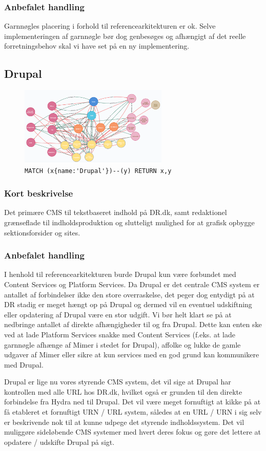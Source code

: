 \documentclass{article}
\begin{document}
\subsubsection*{Anbefalet handling}
Garnnøgles placering i forhold til referencearkitekturen er ok. Selve implementeringen af garnnøgle bør dog genbesøges og afhængigt af det reelle forretningsbehov skal vi have set på en ny implementering.


\subsection{Drupal}
\begin{figure}[H]
\includegraphics[width=200pt]{Drupal.PNG}
\cprotect\caption{\verb|MATCH (x{name:'Drupal'})--(y) RETURN x,y|}
\end{figure}
\subsubsection*{Kort beskrivelse}
Det primære CMS til tekstbaseret indhold på DR.dk, samt redaktionel grænseflade til indholdsproduktion og slutteligt mulighed for at grafisk opbygge sektionsforsider og sites.
\subsubsection*{Anbefalet handling}
I henhold til referencearkitekturen burde Drupal kun være forbundet med Content Services og Platform Services. Da Drupal er det centrale CMS system er antallet af forbindelser ikke den store overraskelse, det peger dog entydigt på at DR stadig er meget hængt op på Drupal og dermed vil en eventuel udskiftning eller opdatering af Drupal være en stor udgift.
Vi bør helt klart se på at nedbringe antallet af direkte afhængigheder til og fra Drupal. 
Dette kan enten ske ved at lade Platform Services snakke med Content Services (f.eks. at lade garnnøgle afhænge af Mimer i stedet for Drupal), affolke og lukke de gamle udgaver af Mimer eller sikre at kun services med en god grund kan kommunikere med Drupal.

Drupal er lige nu vores styrende CMS system, det vil sige at Drupal har kontrollen med alle URL hos DR.dk, hvilket også er grunden til den direkte forbindelse fra Hydra ned til Drupal. Det vil være meget fornuftigt at kikke på at få etableret et fornuftigt URN / URL system, således at en URL / URN i sig selv er beskrivende nok til at kunne udpege det styrende indholdssystem. Det vil muliggøre sideløbende CMS systemer med hvert deres fokus og gøre det lettere at opdatere / udskifte Drupal på sigt.
 
\end{document}
